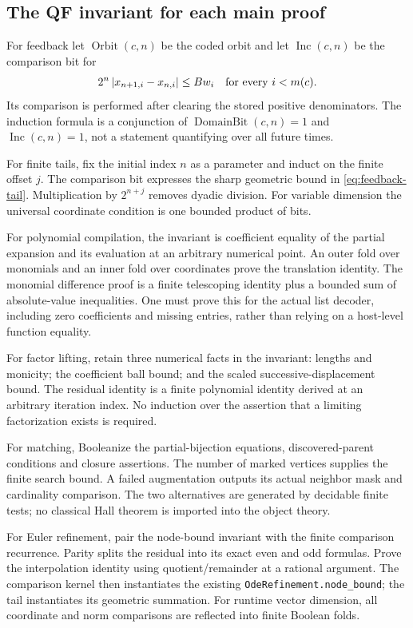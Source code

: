\subsection{The QF invariant for each main proof}

For feedback let \(\operatorname{Orbit}(c,n)\) be the coded orbit and let
\(\operatorname{Inc}(c,n)\) be the comparison bit for
\[
 2^n\left|x_{n+1,i}-x_{n,i}\right|\le B w_i\quad\text{for every }i<m(c).
\]
Its comparison is performed after clearing the stored positive denominators. The induction formula is a conjunction of \(\operatorname{DomainBit}(c,n)=1\) and \(\operatorname{Inc}(c,n)=1\), not a statement quantifying over all future times.

For finite tails, fix the initial index \(n\) as a parameter and induct on the finite offset \(j\). The comparison bit expresses the sharp geometric bound in \eqref{eq:feedback-tail}. Multiplication by \(2^{n+j}\) removes dyadic division. For variable dimension the universal coordinate condition is one bounded product of bits.

For polynomial compilation, the invariant is coefficient equality of the partial expansion and its evaluation at an arbitrary numerical point. An outer fold over monomials and an inner fold over coordinates prove the translation identity. The monomial difference proof is a finite telescoping identity plus a bounded sum of absolute-value inequalities. One must prove this for the actual list decoder, including zero coefficients and missing entries, rather than relying on a host-level function equality.

For factor lifting, retain three numerical facts in the invariant: lengths and monicity; the coefficient ball bound; and the scaled successive-displacement bound. The residual identity is a finite polynomial identity derived at an arbitrary iteration index. No induction over the assertion that a limiting factorization exists is required.

For matching, Booleanize the partial-bijection equations, discovered-parent conditions and closure assertions. The number of marked vertices supplies the finite search bound. A failed augmentation outputs its actual neighbor mask and cardinality comparison. The two alternatives are generated by decidable finite tests; no classical Hall theorem is imported into the object theory.

For Euler refinement, pair the node-bound invariant with the finite comparison recurrence. Parity splits the residual into its exact even and odd formulas. Prove the interpolation identity using quotient/remainder at a rational argument. The comparison kernel then instantiates the existing \texttt{OdeRefinement.node\_bound}; the tail instantiates its geometric summation. For runtime vector dimension, all coordinate and norm comparisons are reflected into finite Boolean folds.

